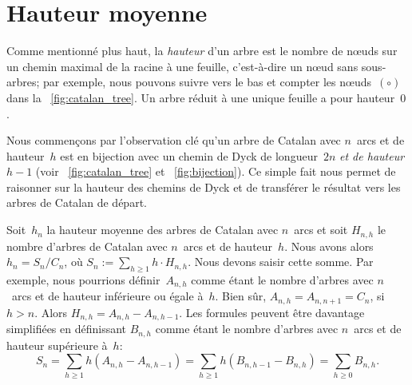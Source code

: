 \section{Hauteur moyenne}
\label{sec:Catalan_height}

Comme mentionné plus haut, la \emph{hauteur} d'un arbre est le nombre
de n{\oe}uds sur un chemin maximal de la racine à une feuille,
c'est-à-dire un n{\oe}ud sans sous-arbres; par exemple, nous pouvons
suivre vers le bas et compter les n{\oe}uds~\((\circ)\) dans la
\fig~\ref{fig:catalan_tree}. Un arbre réduit à une unique feuille a
pour hauteur~\(0\).

Nous commençons par l'observation clé qu'un arbre de Catalan avec
\(n\)~arcs et de hauteur~\(h\) est en bijection avec un chemin de Dyck
de longueur~\(2n\) \emph{et de hauteur \(h-1\)} (voir
\fig~\vref{fig:catalan_tree} et \fig~\ref{fig:bijection}). Ce simple
fait nous permet de raisonner sur la hauteur des chemins de Dyck et de
transférer le résultat vers les arbres de Catalan de départ.

Soit~\(h_n\) la hauteur moyenne des arbres de Catalan avec \(n\)~arcs
et soit \(H_{n,h}\) le nombre d'arbres de Catalan avec \(n\)~arcs et
de hauteur~\(h\). Nous avons alors \(h_n = S_n/C_{n}\), où \(S_n :=
\sum_{h \geqslant 1} h \cdot H_{n,h}\). Nous devons saisir cette
somme. Par exemple, nous pourrions définir~\(A_{n,h}\) comme étant le
nombre d'arbres avec \(n\)~arcs et de hauteur inférieure ou égale
à~\(h\). Bien sûr, \(A_{n,h} = A_{n,n+1} = C_{n}\), si \(h >
n\). Alors \(H_{n,h} = A_{n,h}-A_{n,h-1}\). Les formules peuvent être
davantage simplifiées en définissant \(B_{n,h}\) comme étant le nombre
d'arbres avec \(n\)~arcs et de hauteur supérieure à~\(h\):
\begin{equation}
S_n = \sum_{h \geqslant 1}h(A_{n,h}-A_{n,h-1})
    = \sum_{h \geqslant 1}h(B_{n,h-1}-B_{n,h}) = \sum_{h\geqslant 0} B_{n,h}.
\label{eq_Sn}
\end{equation}

